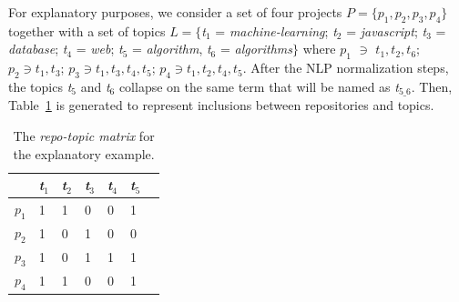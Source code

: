 For explanatory purposes, we consider a set of four projects $P=\{p_1,p_2,p_3,p_4 \}$ together with a set of topics $L=\{$\emph{t$_1$} = \emph{machine-learning}; \emph{t$_2$} = \emph{javascript}; \emph{t$_3$} = \emph{database}; \emph{t$_4$} = \emph{web}; \emph{t$_5$} = \emph{algorithm}, \emph{t$_6$} = \emph{algorithms}$\}$ where $p_1$ $\ni$ $t_1,t_2, t_6$; $p_2 \ni t_1,t_3$; $p_3 \ni t_1 ,t_3, t_4, t_5$; $p_4 \ni t_1,t_2,t_4,t_5$. After the NLP normalization steps, the topics \emph{t$_5$} and \emph{t$_6$} collapse on the same term that will be named as \emph{t$_{5\_6}$}. Then, Table~\ref{tab:repo-topic-matrix} is generated to represent inclusions between repositories and topics.

\begin{table}[t]
	\caption{The \emph{repo-topic matrix} for the explanatory example.}
	\begin{tabular}{|p{0.5cm}|p{0.5cm}|p{0.5cm}|p{0.5cm}|p{0.5cm}|p{0.5cm}|p{0.5cm}|} \hline
		& \emph{t$_1$} & \emph{t$_2$} & \emph{t$_3$} & \emph{t$_4$} & \emph{t$_{5}$} \\ \hline
		$p_1$ & 1 & 1 & 0 & 0 & 1 \\ \hline
		$p_2$ & 1 & 0 & 1 & 0 & 0 \\ \hline
		$p_3$ & 1 & 0 & 1 & 1 & 1 \\ \hline
		$p_4$ & 1 & 1 & 0 & 0 & 1 \\ \hline
	\end{tabular}
    \label{tab:repo-topic-matrix}
\end{table}

